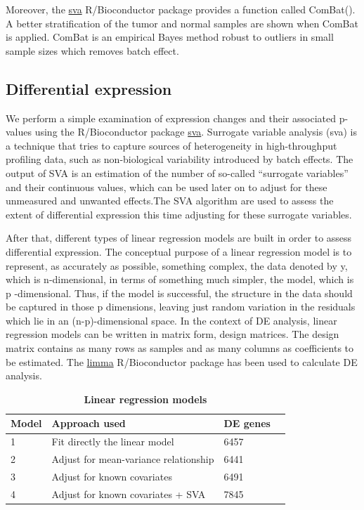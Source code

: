 \documentclass[9pt,twocolumn,twoside]{gsajnl}
\begin{document}
Moreover, the \href{http://www.bioconductor.org/packages/release/bioc/html/sva.html}{sva} R/Bioconductor package provides a function called ComBat(). A better stratification of the tumor and normal samples are shown when ComBat is applied. ComBat is an empirical Bayes method robust to outliers in small sample sizes which removes batch effect. 


\subsection*{Differential expression}
We perform a simple examination of expression changes and their associated p-values using the R/Bioconductor package \href{http://www.bioconductor.org/packages/release/bioc/html/sva.html}{sva}. Surrogate variable analysis (sva) is a technique that tries to capture sources of heterogeneity in high-throughput profiling data, such as non-biological variability introduced by batch effects. The output of SVA is an estimation of the number of so-called “surrogate variables” and their continuous values, which can be used later on to adjust for these unmeasured and unwanted effects.The SVA algorithm are used to assess the extent of differential expression this time adjusting for these surrogate variables. 

After that, different types of linear regression models are built in order to assess differential expression. The conceptual purpose of a linear regression model is to represent, as accurately as possible, something complex, the data denoted by y, which is n-dimensional, in terms of something much simpler, the model, which is p -dimensional. Thus, if the model is successful, the structure in the data should be captured in those p dimensions, leaving just random variation in the residuals which lie in an (n-p)-dimensional space. In the context of DE analysis, linear regression models can be written in matrix form, design matrices. The design matrix contains as many rows as samples and as many columns as coefficients to be estimated. The \href{https://bioconductor.org/packages/release/bioc/html/limma.html}{limma} R/Bioconductor package has been used to calculate DE analysis. \\

\begin{table}[htbp]
\centering
\caption{\bf Linear regression models}
\begin{tableminipage}{\textwidth}
\begin{tabularx}{\textwidth}{XXXX}
\hline
Model & Approach used & DE genes \\ [0.5ex]
\hline
1 & Fit directly the linear model & 6457 \\
2 & Adjust for mean-variance relationship & 6441 \\
3 & Adjust for known covariates & 6491 \\
4 & Adjust for known covariates + SVA & 7845 \\
\hline
\end{tabularx}
  \label{tab:shape-functions}
\end{tableminipage}
\end{table}
\end{document}
